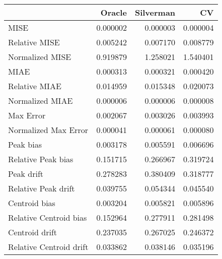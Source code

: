 \begin{tabular}{lrrr}
  \hline
 & Oracle & Silverman & CV \\ 
  \hline
MISE & 0.000002 & 0.000003 & 0.000004 \\ 
  Relative MISE & 0.005242 & 0.007170 & 0.008779 \\ 
  Normalized MISE & 0.919879 & 1.258021 & 1.540401 \\ 
  MIAE & 0.000313 & 0.000321 & 0.000420 \\ 
  Relative MIAE & 0.014959 & 0.015348 & 0.020073 \\ 
  Normalized MIAE & 0.000006 & 0.000006 & 0.000008 \\ 
  Max Error & 0.002067 & 0.003026 & 0.003993 \\ 
  Normalized Max Error & 0.000041 & 0.000061 & 0.000080 \\ 
  Peak bias & 0.003178 & 0.005591 & 0.006696 \\ 
  Relative Peak bias & 0.151715 & 0.266967 & 0.319724 \\ 
  Peak drift & 0.278283 & 0.380409 & 0.318777 \\ 
  Relative Peak drift & 0.039755 & 0.054344 & 0.045540 \\ 
  Centroid bias & 0.003204 & 0.005821 & 0.005896 \\ 
  Relative Centroid bias & 0.152964 & 0.277911 & 0.281498 \\ 
  Centroid drift & 0.237035 & 0.267025 & 0.246372 \\ 
  Relative Centroid drift & 0.033862 & 0.038146 & 0.035196 \\ 
   \hline
\end{tabular}
